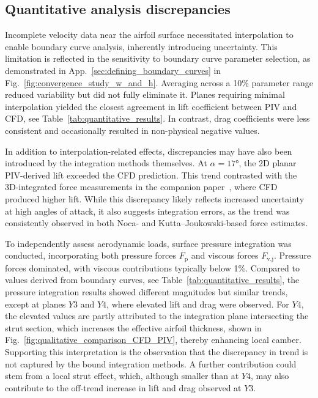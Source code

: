 \documentclass[wes, manuscript]{copernicus}
\begin{document}
\subsection{Quantitative analysis discrepancies}
%
Incomplete velocity data near the airfoil surface necessitated interpolation to enable boundary curve analysis, inherently introducing uncertainty. This limitation is reflected in the sensitivity to boundary curve parameter selection, as demonstrated in App.~\ref{sec:defining_boundary_curves} in Fig.~\ref{fig:convergence_study_w_and_h}. Averaging across a 10\% parameter range reduced variability but did not fully eliminate it. Planes requiring minimal interpolation yielded the closest agreement in lift coefficient between PIV and CFD, see Table~\ref{tab:quantitative_results}. In contrast, drag coefficients were less consistent and occasionally resulted in non-physical negative values.

In addition to interpolation-related effects, discrepancies may have also been introduced by the integration methods themselves. 
At $\alpha = 17\unit{\degree}$, the 2D planar PIV-derived lift exceeded the CFD prediction. This trend contrasted with the 3D-integrated force measurements in the companion paper~\citep{Poland2025a}, where CFD produced higher lift.
While this discrepancy likely reflects increased uncertainty at high angles of attack, it also suggests integration errors, as the trend was consistently observed in both Noca- and Kutta–Joukowski-based force estimates.

To independently assess aerodynamic loads, surface pressure integration was conducted, incorporating both pressure forces $F_{\textrm{p}}$ and viscous forces $F_{\textrm{v,j}}$. Pressure forces dominated, with viscous contributions typically below 1\%. Compared to values derived from boundary curves, see  Table~\ref{tab:quantitative_results}, the pressure integration results showed different magnitudes but similar trends, except at planes $Y3$ and $Y4$, where elevated lift and drag were observed. For $Y4$, the elevated values are partly attributed to the integration plane intersecting the strut section, which increases the effective airfoil thickness, shown in Fig.~\ref{fig:qualitative_comparison_CFD_PIV}, thereby enhancing local camber. Supporting this interpretation is the observation that the discrepancy in trend is not captured by the bound integration methods. A further contribution could stem from a local strut effect, which, although smaller than at $Y4$, may also contribute to the off-trend increase in lift and drag observed at $Y3$.
%
\end{document}
